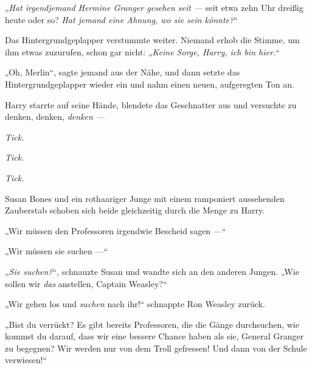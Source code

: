 „\emph{Hat irgendjemand Hermine Granger gesehen seit —} seit etwa zehn Uhr dreißig heute oder so? \emph{Hat jemand eine Ahnung, wo sie sein könnte?}“


Das Hintergrundgeplapper verstummte weiter. Niemand erhob die Stimme, um ihm etwas zuzurufen, schon gar nicht:
„\emph{Keine Sorge, Harry, ich bin hier.}“

„Oh, Merlin“, sagte jemand aus der Nähe, und dann setzte das Hintergrundgeplapper wieder ein und nahm einen neuen, aufgeregten Ton an.

Harry starrte auf seine Hände, blendete das Geschnatter aus und versuchte zu denken, denken, \emph{denken —}

\emph{Tick.}

\emph{Tick.}

\emph{Tick.}

Susan Bones und ein rothaariger Junge mit einem ramponiert aussehenden Zauberstab schoben sich beide gleichzeitig durch die Menge zu Harry.

„Wir müssen den Professoren irgendwie Bescheid sagen —“

„Wir müssen sie suchen —“

„\emph{Sie suchen?}“, schnauzte Susan und wandte sich an den anderen Jungen.
„Wie sollen wir \emph{das} anstellen, Captain Weasley?“

„Wir gehen los und \emph{suchen} nach ihr!“ schnappte Ron Weasley zurück.

„Bist du verrückt? Es gibt bereits Professoren, die die Gänge durchsuchen, wie kommst du darauf, dass wir eine bessere Chance haben als sie, General Granger zu begegnen? Wir werden nur von dem Troll gefressen! Und dann von der Schule verwiesen!“

